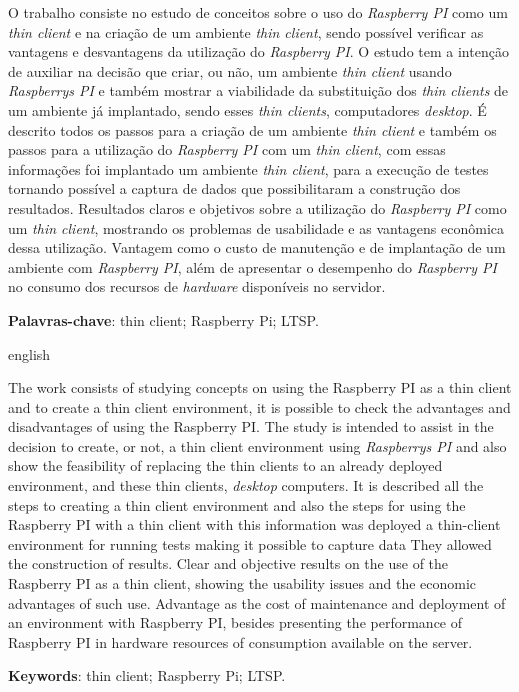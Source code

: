 \documentclass[
	12pt,				%
	openright,			%
	twoside,			%
	a4paper,			%
	chapter=TITLE,		%
	english,			%
	brazil				%
	]{abntex2}
\begin{document}
\setlength{\absparsep}{18pt} %
\begin{resumo}
O trabalho consiste no estudo de conceitos sobre o uso do \textit{Raspberry PI} como um \textit{thin client} e na criação de um ambiente \textit{thin client}, sendo possível verificar as vantagens e desvantagens da utilização do \textit{Raspberry PI}. O estudo tem a intenção de auxiliar na decisão que criar, ou não, um ambiente \textit{thin client} usando \textit{Raspberrys PI} e também mostrar a viabilidade da substituição  dos \textit{thin clients} de um ambiente já implantado, sendo esses \textit{thin clients}, computadores \textit{desktop}. É descrito todos os passos para a criação de um ambiente \textit{thin client} e também os passos para a utilização do \textit{Raspberry PI} com um \textit{thin client}, com essas informações foi implantado um ambiente \textit{thin client}, para a execução de testes tornando possível a captura de dados que possibilitaram a construção dos resultados. Resultados claros e objetivos sobre a utilização do \textit{Raspberry PI} como um \textit{thin client}, mostrando os problemas de usabilidade e as vantagens econômica dessa utilização. Vantagem como o custo de manutenção e de implantação de um ambiente com \textit{Raspberry PI}, além de apresentar o desempenho do \textit{Raspberry PI} no consumo dos recursos de \textit{hardware} disponíveis no servidor.


 \textbf{Palavras-chave}: thin client; Raspberry Pi; LTSP.	%
\end{resumo}

\begin{resumo}[Abstract]
 \begin{otherlanguage*}{english}
   
   The work consists of studying concepts on using the Raspberry PI as a thin client and to create a thin client environment, it is possible to check the advantages and disadvantages of using the Raspberry PI. The study is intended to assist in the decision to create, or not, a thin client environment using \textit{Raspberrys PI} and also show the feasibility of replacing the thin clients to an already deployed environment, and these thin clients, \textit{desktop} computers. It is described all the steps to creating a thin client environment and also the steps for using the Raspberry PI with a thin client with this information was deployed a thin-client environment for running tests making it possible to capture data They allowed the construction of results. Clear and objective results on the use of the Raspberry PI as a thin client, showing the usability issues and the economic advantages of such use. Advantage as the cost of maintenance and deployment of an environment with Raspberry PI, besides presenting the performance of Raspberry PI in hardware resources of consumption available on the server.

   \vspace{\onelineskip}
 
   \noindent 
   \textbf{Keywords}: thin client; Raspberry Pi; LTSP.
 \end{otherlanguage*}
\end{resumo}
\end{document}
